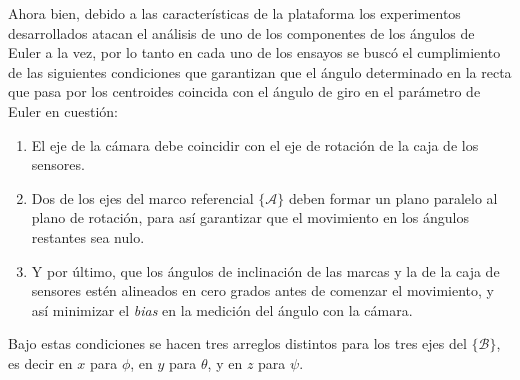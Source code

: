 \documentclass[10pt]{report}
\numberwithin{equation}{chapter}
\numberwithin{algorithm}{chapter}
\newcommand{\bias}{\emph{bias} }
\newcommand{\marco}[1]{\{\mathcal{#1}\}}
\begin{document}
Ahora bien, debido a las características de la plataforma los experimentos desarrollados atacan el análisis de uno de los componentes de los ángulos de Euler a la vez, por lo tanto en cada uno de los ensayos se buscó el cumplimiento de las siguientes condiciones que garantizan que el ángulo determinado en la recta que pasa por los centroides coincida con el ángulo de giro en el parámetro de Euler en cuestión:
\begin{enumerate}
\item El eje de la cámara debe coincidir con el eje de rotación de la caja de los sensores.
\item Dos de los ejes del marco referencial $\marco{A}$ deben formar un plano paralelo al plano de rotación, para así garantizar que el movimiento en los ángulos restantes sea nulo.
\item Y por último, que los ángulos de inclinación de las marcas y la de la caja de sensores estén alineados en cero grados antes de comenzar el movimiento, y así minimizar el \bias en la medición del ángulo con la cámara.
\end{enumerate}
Bajo estas condiciones se hacen tres arreglos distintos para los tres ejes del $\marco{B}$, es decir en $x$ para $\phi$, en $y$ para $\theta$, y en $z$ para $\psi$.
\end{document}
